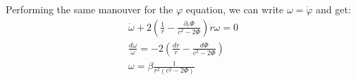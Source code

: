 \documentclass{article}
\begin{document}
Performing the same manouver for the $\varphi$ equation, we can write $\omega = \dot{\varphi}$ and get:
\begin{equation}
\begin{gathered}
    \dot{\omega} + 2\left(\frac{1}{r} - \frac{\partial_r \Phi}{c^2 - 2\Phi}\right)\dot{r}\omega = 0
    \\
    \frac{d\omega}{\omega} = - 2\left(\frac{dr}{r} - \frac{d\Phi}{c^2 - 2\Phi}\right)
    \\
    \omega = \beta \frac{1}{r^2\left(c^2 - 2\Phi\right)}
\end{gathered}
\end{equation}
\end{document}
